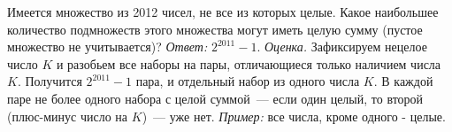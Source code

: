 \problem
Имеется множество из 2012 чисел, не все из которых целые.
Какое наибольшее количество подмножеств этого множества могут иметь целую
сумму (пустое множество не учитывается)?
\solution
\emph{Ответ:} $2^{2011} - 1$.
\emph{Оценка.}
Зафиксируем нецелое число $K$ и разобьем все наборы на пары, отличающиеся
только наличием числа $K$.
Получится $2^{2011} - 1$ пара, и отдельный набор из одного числа $K$.
В каждой паре не более одного набора с целой суммой~--- если один целый,
то второй (плюс-минус число на $K$)~--- уже нет.
\emph{Пример:}
все числа, кроме одного - целые.
\endproblem
